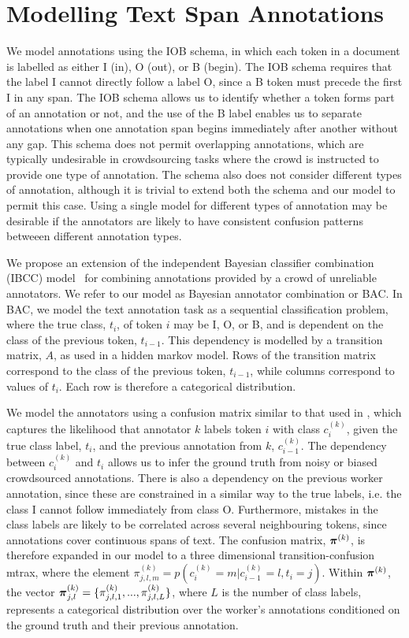\section{Modelling Text Span Annotations}\label{sec:model}

We model annotations using the IOB schema, in which each token in a document is labelled as either I (in), O (out), or B (begin). The IOB schema requires that the label I cannot directly follow a label O, since a B token must precede the first I in any span. The IOB schema allows us to identify whether a token forms part of an annotation or not, and the use of the B label enables us to separate annotations when one annotation span begins immediately after another without any gap. This schema does not permit overlapping annotations, which are typically undesirable in crowdsourcing tasks where the crowd is instructed to provide one type of annotation. The schema also does not consider different types of annotation, although it is trivial to extend both the schema and our model to permit this case. Using a single model for different types of annotation may be desirable if the annotators are likely to have consistent confusion patterns betweeen different annotation types. 

We propose an extension of the independent Bayesian classifier combination (IBCC) 
model~\cite{kim2012bayesian} for combining annotations provided by a crowd of unreliable annotators. We refer to our model as Bayesian annotator combination or BAC. In BAC, we model the text annotation task as a sequential classification problem, where the true class, $t_i$, of token $i$ may be I, O, or B, and is dependent on the class of the previous token, $t_{i-1}$. This dependency is modelled by a transition matrix, $A$, as used in a hidden markov model. Rows of the transition matrix correspond to the class of the previous token, $t_{i-1}$, while columns correspond to values of $t_i$. Each row is therefore a categorical distribution. 

We model the annotators using a confusion matrix similar to that used in \cite{simpsonlong}, which captures the likelihood that annotator $k$ labels token $i$ with class $c_i^{(k)}$, given the true class label, $t_i$, and the previous annotation from $k$, $c_{i-1}^{(k)}$. The dependency between $c_i^{(k)}$ and $t_i$ allows us to infer the ground truth from noisy or biased crowdsourced annotations. There is also a dependency on the previous worker annotation, since these are constrained in a similar way to the true labels, i.e. the class I cannot follow immediately from class O. Furthermore, mistakes in the class labels are likely to be correlated across several neighbouring tokens, since annotations cover continuous
spans of text. The confusion matrix, $\boldsymbol\pi^{(k)}$, is therefore expanded in our model to a three dimensional transition-confusion mtrax, where the element $\pi_{j,l,m}^{(k)} = p(c_i^{(k)} = m | c_{i-1}^{(k)}=l, t_i=j)$. Within $\boldsymbol\pi^{(k)}$, the vector $\boldsymbol\pi_{j,l}^{(k)} = \{ \pi_{j,l,1}^{(k)},...,\pi_{j,l,L}^{(k)}\} $, where $L$ is the number of class labels, represents a categorical distribution over the worker's annotations conditioned on the ground truth and their previous annotation.

